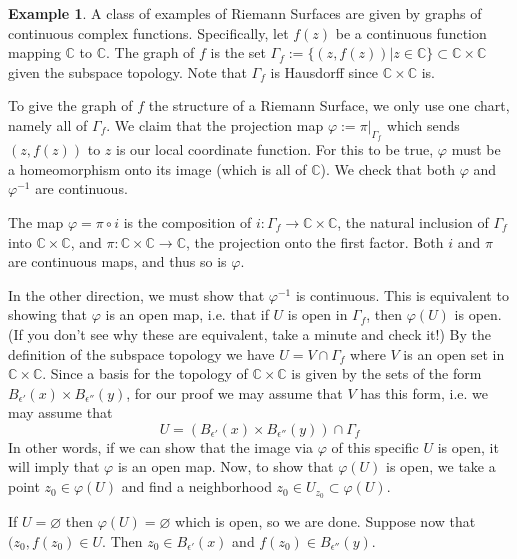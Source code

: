 \documentclass[12pt]{book}%
\theoremstyle{plain}
\theoremstyle{definition}
\newtheorem{example}[theorem]{Example}
\theoremstyle{remark}
\def\to{\rightarrow}
\def\bC{{\mathbb{C}}}
\begin{document}
\begin{example}
\label{graphsAreRSExample}
A class of examples of Riemann Surfaces are given by graphs of continuous complex functions. Specifically, let $f(z)$ be a continuous function mapping $\bC$ to $\bC$. The graph of $f$ is the set $\Gamma_f:=\{(z,f(z)) | z \in \bC \} \subset \bC\times \bC$ given the subspace topology. Note that $\Gamma_f$ is Hausdorff since $\bC\times\bC$ is.

\begin{figure}
\label{schematicGraph}
\end{figure}

To give the graph of $f$ the structure of a Riemann Surface, we only use one chart, namely all of $\Gamma_f$. We claim that the projection map $\varphi:=\pi|_{\Gamma_f}$ which sends $(z,f(z))$ to $z$ is our local coordinate function. For this to be true, $\varphi$ must be a homeomorphism onto its image (which is all of $\bC$). We check that both $\varphi$ and $\varphi^{-1}$ are continuous.

The map $\varphi=\pi \circ i$ is the composition of $i:\Gamma_f \to \bC\times\bC$, the natural inclusion of $\Gamma_f$ into $\bC\times\bC$, and $\pi:\bC\times\bC \to \bC$, the projection onto the first factor. Both $i$ and $\pi$ are continuous maps, and thus so is $\varphi$.

In the other direction, we must show that $\varphi^{-1}$ is continuous. This is equivalent to showing that $\varphi$ is an open map, i.e. that if $U$ is open in $\Gamma_f$, then $\varphi(U)$ is open. (If you don't see why these are equivalent, take a minute and check it!) By the definition of the subspace topology we have $U=V \cap \Gamma_f$ where $V$ is an open set in $\bC \times \bC$. Since a basis for the topology of $\bC \times \bC$ is given by the sets of the form $B_{\epsilon'}(x) \times B_{\epsilon''}(y)$, for our proof we may assume that $V$ has this form, i.e. we may assume that 
\[
U=\left( B_{\epsilon'}(x) \times B_{\epsilon''}(y) \right) \cap \Gamma_f
\]
In other words, if we can show that the image via $\varphi$ of this specific $U$ is open, it will imply that $\varphi$ is an open map. Now, to show that $\varphi(U)$ is open, we take a point $z_0 \in \varphi(U)$ and find a neighborhood $z_0 \in U_{z_0}\subset \varphi(U)$.

If $U=\varnothing$ then $\varphi(U)=\varnothing$ which is open, so we are done. Suppose now that $(z_0, f(z_0) \in U$. Then $z_0 \in B_{\epsilon'}(x)$ and $f(z_0) \in B_{\epsilon''}(y)$. 


\end{example}
\end{document}
